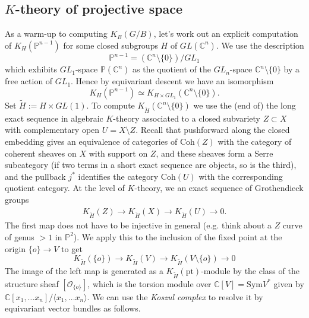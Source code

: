\documentclass[11pt]{amsart}
\theoremstyle{definition}
\newcommand{\bC}{\mathbb{C}}
\newcommand{\bP}{\mathbb{P}}
\newcommand{\Oc}{\mathcal{O}}
\newcommand{\Coh}{\mathrm{Coh}}
\numberwithin{equation}{subsection}
\numberwithin{figure}{subsection}
\newcommand{\pt}{\mathrm{pt}}
\begin{document}
\subsection{$K$-theory of projective space}
As a warm-up to computing $K_B(G/B)$, let's work out an explicit computation of
$K_{H}(\mathbb{P}^{n-1})$ {for some closed subgroups $H$ of $GL(\bC^n)$.} We use the description 
$$
\mathbb{P}^{n-1} = \left(\bC^n\setminus\{0\}\right) / GL_1
$$
which exhibits $GL_1$-space $\mathbb{P}(\bC^n)$ as the quotient of the $GL_n$-space $\bC^n\setminus\{0\}$ by a free action of $GL_1$. Hence by equivariant descent we have an isomorphism
$$
K_{H}(\mathbb{P}^{n-1}) \simeq K_{H\times GL_1}(\bC^n\setminus\{0\}).
$$
Set $\tilde H:=H\times GL(1)$. To compute $K_{{\tilde H}}(\bC^n\setminus\{0\})$ we use the (end of) the long exact sequence in algebraic $K$-theory associated to a closed subvariety $Z\subset X$ with complementary open $U=X\setminus Z$. Recall that pushforward along the closed embedding  gives an equivalence of categories of $\Coh(Z)$ with the category of coherent sheaves on $X$ with support on $Z$, and these sheaves form a Serre subcategory (if two terms in a short exact sequence are objects, so is the third), and the pullback $j^*$ identifies the category $\Coh(U)$ with the corresponding quotient category. At the level of $K$-theory, we an exact sequence of Grothendieck groups
\begin{align}
\label{eq:excision}
K_{\tilde H}(Z)\rightarrow K_{\tilde H}(X)\rightarrow K_{\tilde H}(U)\rightarrow 0.
\end{align}
The first map does not have to be injective in general (e.g. think about a $Z$ curve of genus $>1$ in $\bP^2$). We apply this to the inclusion of the fixed point at the origin $\{o\}\rightarrow V$ to get
$$
K_{\tilde H}(\{o\}) \rightarrow K_{\tilde H}(V) \rightarrow K_{\tilde H}(V\setminus\{o\})\rightarrow 0
$$
The image of the left map is generated as a $K_{{\tilde H}}(\pt)$-module by the class of the structure sheaf $[\Oc_{\{o\}}]$, which is the torsion module over $\mathbb{C}[V]=\mathrm{Sym} V^*$ given by $\bC[x_1,\ldots x_n]/\langle x_1,\ldots x_n\rangle$. We can use the \emph{Koszul complex} to resolve it by equivariant vector bundles as follows. 
\end{document}
